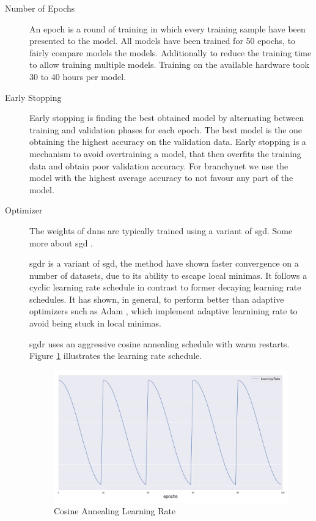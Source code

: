\begin{description}
	\item[Number of Epochs] An epoch is a round of training in which every training sample have been presented to the model. All models have been trained for 50 epochs, to fairly compare models the models. Additionally to reduce the training time to allow training multiple models. Training on the available hardware took 30 to 40 hours per model.
	
	\item[Early Stopping] Early stopping is finding the best obtained model by alternating between training and validation phases for each epoch. The best model is the one obtaining the highest accuracy on the validation data. Early stopping is a mechanism to avoid overtraining a model, that then overfits the training data and obtain poor validation accuracy. For \gls{branchynet} we use the model with the highest average accuracy to not favour any part of the model.  
	  
	\item[Optimizer] The weights of \gls{dnn}s are typically trained using a variant of \gls{sgd}. Some more about \gls{sgd} \cite{goodfellow_deep_2016}.
	
	\gls{sgdr} \cite{loshchilov_sgdr:_2016} is a variant of \gls{sgd}, the method have shown faster convergence on a number of datasets, due to its ability to escape local minimas. It follows a cyclic learning rate schedule in contrast to former decaying learning rate schedules. It has shown, in general, to perform better than adaptive optimizers such as Adam \cite{kingma_adam:_2014}, which implement adaptive learnining rate to avoid being stuck in local minimas. 
	
	\gls{sgdr} uses an aggressive cosine annealing schedule with warm restarts. Figure \ref{fig:cosineannealing} illustrates the learning rate schedule.
	
	\begin{figure}
		\centering
		\includegraphics[width=.7\linewidth]{figures/lr.png}
		\caption[Cosine Annealing Learning Rate]{Cosine Annealing Learning Rate} \label{fig:cosineannealing}
	\end{figure}


\end{description}

